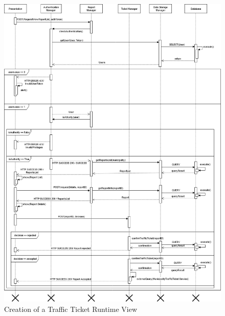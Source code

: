 \begin{figure}[H]
          \includegraphics[scale=0.4]{Images/gen_multa_definitivo.png}
        \caption{Creation of a Traffic Ticket Runtime View}
\end{figure}

